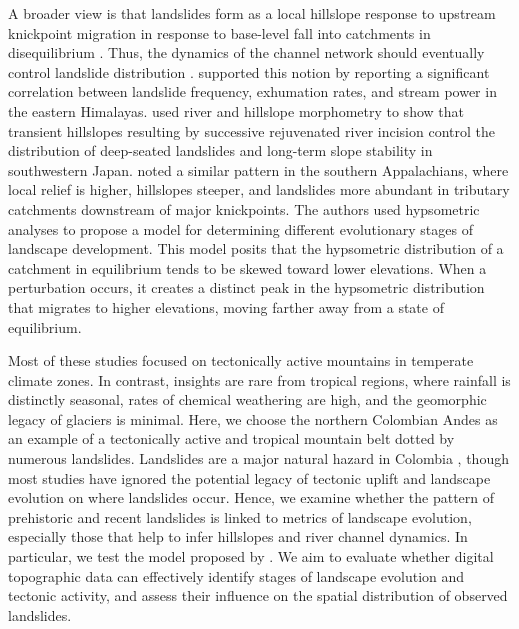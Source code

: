\documentclass[draft]{agujournal2019}
\begin{document}
\par A broader view is that landslides form as a local hillslope response to upstream knickpoint migration in response to base-level fall into catchments in disequilibrium \cite{Wobus2006, hovius2006, Whipple2002}. Thus, the dynamics of the channel network should eventually control landslide distribution \cite{montgomery1994, burbank1996}.  supported this notion by reporting a significant correlation between landslide frequency, exhumation rates, and stream power in the eastern Himalayas.  used river and hillslope morphometry to show that transient hillslopes resulting by successive rejuvenated river incision control the distribution of deep-seated landslides and long-term slope stability in southwestern Japan.  noted a similar pattern in the southern Appalachians, where local relief is higher, hillslopes steeper, and landslides more abundant in tributary catchments downstream of major knickpoints. The authors used hypsometric analyses to propose a model for determining different evolutionary stages of landscape development. This model posits that the hypsometric distribution of a catchment in equilibrium tends to be skewed toward lower elevations. When a perturbation occurs, it creates a distinct peak in the hypsometric distribution that migrates to higher elevations, moving farther away from a state of equilibrium. 

\par Most of these studies focused on tectonically active mountains in temperate climate zones. In contrast, insights are rare from tropical regions, where rainfall is distinctly seasonal, rates of chemical weathering are high, and the geomorphic legacy of glaciers is minimal. Here, we choose the northern Colombian Andes as an example of a tectonically active and tropical mountain belt dotted by numerous landslides. Landslides are a major natural hazard in Colombia \cite{gomez2023spatial, aristizabal2020}, though most studies have ignored the potential legacy of tectonic uplift and landscape evolution on where landslides occur. Hence, we examine whether the pattern of prehistoric and recent landslides is linked to metrics of landscape evolution, especially those that help to infer hillslopes and river channel dynamics. In particular, we test the model proposed by . We aim to evaluate whether digital topographic data can effectively identify stages of landscape evolution and tectonic activity, and assess their influence on the spatial distribution of observed landslides.
\end{document}
